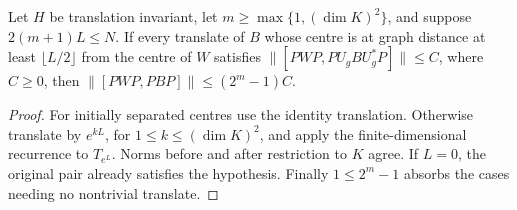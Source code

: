 \begin{lemma}
    \label{lem:hastings_finite_observable_orbit}
    \leanok
    Let $H$ be translation invariant, let $m\ge\max\{1,(\dim K)^2\}$,
    and suppose $2(m+1)L\le N$. If every translate of $B$ whose centre
    is at graph distance at least $\lfloor L/2\rfloor$ from the centre
    of $W$ satisfies $\|[PWP,PU_gBU_g^*P]\|\le C$, where $C\ge0$,
    then $\|[PWP,PBP]\|\le(2^m-1)C$.
\end{lemma}
\begin{proof}\leanok
    For initially separated centres use the identity translation.
    Otherwise translate by $e^{kL}$, for $1\le k\le(\dim K)^2$,
    and apply the finite-dimensional recurrence to $T_{e^L}$.
    Norms before and after restriction to $K$ agree. If $L=0$, the
    original pair already satisfies the hypothesis. Finally
    $1\le2^m-1$ absorbs the cases needing no nontrivial translate.
\end{proof}

